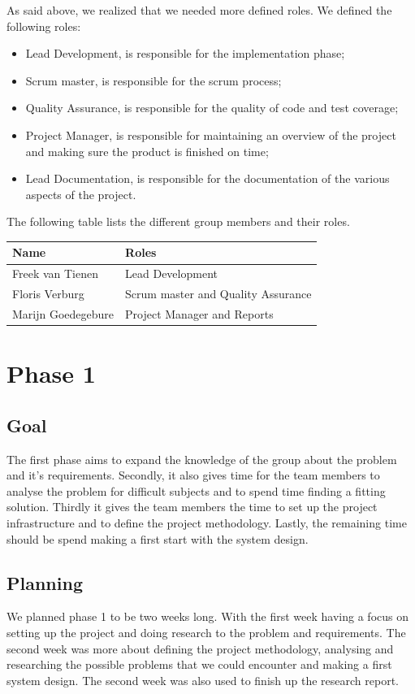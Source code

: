 As said above, we realized that we needed more defined roles.
We defined the following roles:
\begin{itemize}
\item Lead Development, is responsible for the implementation phase;
\item Scrum master, is responsible for the scrum process;
\item Quality Assurance, is responsible for the quality of code and test coverage;
\item Project Manager, is responsible for maintaining an overview of the project and making sure the product is finished on time;
\item Lead Documentation, is responsible for the documentation of the various aspects of the project.
\end{itemize}

The following table lists the different group members and their roles.\\
\begin{tabular}{|l|l|}
\hline
Name & Roles\\
\hline
Freek van Tienen & Lead Development\\
\hline
Floris Verburg & Scrum master and Quality Assurance\\
\hline
Marijn Goedegebure & Project Manager and Reports\\
\hline
\end{tabular}

\section{Phase 1}
\subsection{Goal}
The first phase aims to expand the knowledge of the group about the problem and it's requirements.
Secondly, it also gives time for the team members to analyse the problem for difficult subjects and to spend time finding a fitting solution.
Thirdly it gives the team members the time to set up the project infrastructure and to define the project methodology.
Lastly, the remaining time should be spend making a first start with the system design.

\subsection{Planning}
We planned phase 1 to be two weeks long.
With the first week having a focus on setting up the project and doing research to the problem and requirements.
The second week was more about defining the project methodology, analysing and researching the possible problems that we could encounter and making a first system design.
The second week was also used to finish up the research report.

